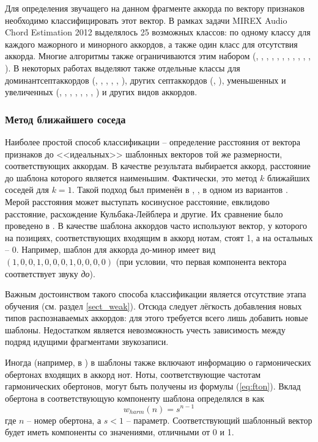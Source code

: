 Для определения звучащего на данном фрагменте аккорда по вектору признаков
необходимо классифицировать этот вектор. В рамках задачи MIREX Audio Chord
Estimation 2012 выделялось 25 возможных классов: по одному классу для каждого
мажорного и минорного аккордов, а также один класс для отсутствия аккорда.
Многие алгоритмы также ограничиваются этим набором (\cite{Bello2005},
\cite{Lee2006}, \cite{Khadkevich2009}, \cite{Oudre2009}, \cite{Weller2009},
\cite{Cho2010}, \cite{Rocher2010}, \cite{Cho2011}, \cite{Jiang2011},
\cite{Ni2011}, \cite{Chen2012}, \cite{Humphrey2012}). В некоторых работах
выделяют также отдельные классы для доминантсептаккордов (\cite{Sheh2003},
\cite{Mauch2008}, \cite{Zhang2008}, \cite{Mauch2009}, \cite{Mauch2010},
\cite{DeHaas2012}), других септаккордов (\cite{Sheh2003}, \cite{Mauch2010}),
уменьшенных и увеличенных (\cite{Sheh2003}, \cite{Burgoyne2007},
\cite{Lee2008}, \cite{Mauch2008}, \cite{Sumi2008}, \cite{Mauch2009},
\cite{Mauch2010}, \cite{Ni2012}) и других видов аккордов.

\subsubsection{Метод ближайшего соседа}

Наиболее простой способ классификации -- определение расстояния от вектора
признаков до <<идеальных>> шаблонных векторов той же размерности,
соответствующих аккордам. В качестве результата выбирается аккорд, расстояние до
шаблона которого является наименьшим. Фактически, это метод $k$ ближайших
соседей для $k=1$. Такой подход был применён в \cite{Lee2006}, \cite{Oudre2009},
в одном из вариантов \cite{Jiang2011}. Мерой расстояния может выступать
косинусное расстояние, евклидово расстояние, расхождение Кульбака-Лейблера и
другие. Их сравнение было проведено в \cite{Oudre2009}. В качестве шаблона
аккордов часто используют вектор, у которого на позициях, соответствующих
входящим в аккорд нотам, стоят 1, а на остальных -- 0. Например, шаблон для
аккорда до-минор имеет вид $(1,0,0,1,0,0,0,1,0,0,0,0)$ (при условии, что первая
компонента вектора соответствует звуку \emph{до}).

Важным достоинством такого способа классификации является отсутствие этапа
обучения (см. раздел \ref{sect_weak}). Отсюда следует лёгкость добавления новых
типов распознаваемых аккордов: для этого требуется всего лишь добавить новые
шаблоны. Недостатком является невозможность учесть зависимость между подряд
идущими фрагментами звукозаписи.

Иногда (например, в \cite{Oudre2009}) в шаблоны также включают информацию о
гармонических обертонах входящих в аккорд нот. Ноты, соответствующие частотам
гармонических обертонов, могут быть получены из формулы (\ref{eq:fton}). Вклад
обертона в соответствующую компоненту шаблона определялся в \cite{Gomez2006} как
\begin{equation} \label{eq:templates_harmonics}
w_{harm}(n) = s^{n-1}
\end{equation}
где $n$ -- номер обертона, а $s < 1$ -- параметр. Соответствующий шаблонный
вектор будет иметь компоненты со значениями, отличными от 0 и 1.

